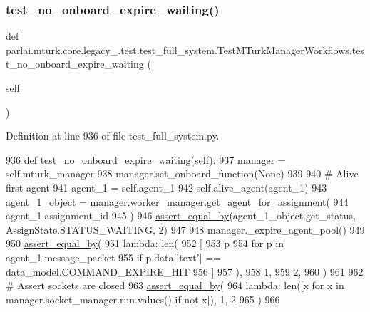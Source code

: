 \subsubsection{\texorpdfstring{test\+\_\+no\+\_\+onboard\+\_\+expire\+\_\+waiting()}{test\_no\_onboard\_expire\_waiting()}}
{\footnotesize\ttfamily def parlai.\+mturk.\+core.\+legacy\+\_.\+test.\+test\+\_\+full\+\_\+system.\+Test\+M\+Turk\+Manager\+Workflows.\+test\+\_\+no\+\_\+onboard\+\_\+expire\+\_\+waiting (\begin{DoxyParamCaption}\item[{}]{self }\end{DoxyParamCaption})}



Definition at line 936 of file test\+\_\+full\+\_\+system.\+py.


\begin{DoxyCode}
936     \textcolor{keyword}{def }test\_no\_onboard\_expire\_waiting(self):
937         manager = self.mturk\_manager
938         manager.set\_onboard\_function(\textcolor{keywordtype}{None})
939 
940         \textcolor{comment}{# Alive first agent}
941         agent\_1 = self.agent\_1
942         self.alive\_agent(agent\_1)
943         agent\_1\_object = manager.worker\_manager.get\_agent\_for\_assignment(
944             agent\_1.assignment\_id
945         )
946         \hyperlink{namespaceparlai_1_1mturk_1_1core_1_1test_1_1test__full__system_a0b463246d35658a2e422010f13dcf819}{assert\_equal\_by}(agent\_1\_object.get\_status, AssignState.STATUS\_WAITING, 2)
947 
948         manager.\_expire\_agent\_pool()
949 
950         \hyperlink{namespaceparlai_1_1mturk_1_1core_1_1test_1_1test__full__system_a0b463246d35658a2e422010f13dcf819}{assert\_equal\_by}(
951             \textcolor{keyword}{lambda}: len(
952                 [
953                     p
954                     \textcolor{keywordflow}{for} p \textcolor{keywordflow}{in} agent\_1.message\_packet
955                     \textcolor{keywordflow}{if} p.data[\textcolor{stringliteral}{'text'}] == data\_model.COMMAND\_EXPIRE\_HIT
956                 ]
957             ),
958             1,
959             2,
960         )
961 
962         \textcolor{comment}{# Assert sockets are closed}
963         \hyperlink{namespaceparlai_1_1mturk_1_1core_1_1test_1_1test__full__system_a0b463246d35658a2e422010f13dcf819}{assert\_equal\_by}(
964             \textcolor{keyword}{lambda}: len([x \textcolor{keywordflow}{for} x \textcolor{keywordflow}{in} manager.socket\_manager.run.values() \textcolor{keywordflow}{if} \textcolor{keywordflow}{not} x]), 1, 2
965         )
966 
\end{DoxyCode}
